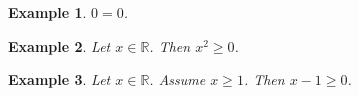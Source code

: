 \documentclass{article}
\newtheorem{example}{Example}
\begin{document}
\begin{example}
$0=0$.
\end{example}

\begin{example}
Let $x\in\mathbb{R}$. Then $x^2\geq 0$.
\end{example}

\begin{example}
Let $x\in\mathbb{R}$. Assume $x\geq 1$. Then $x-1\geq 0$.
\end{example}
\end{document}
